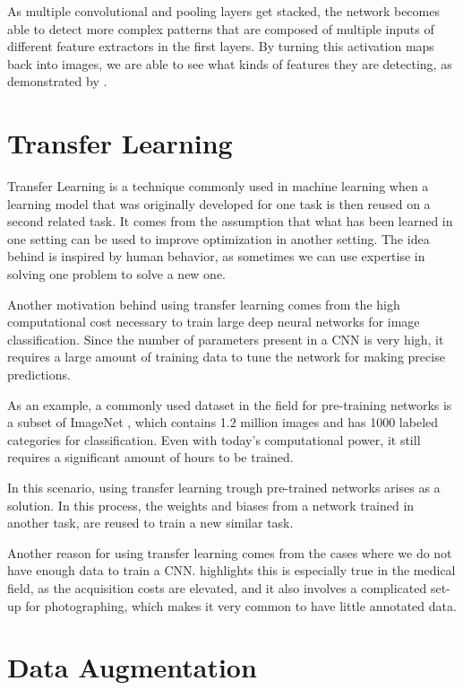 
As multiple convolutional and pooling layers get stacked, the network becomes able to detect more complex patterns that are composed of multiple inputs of different feature extractors in the first layers. By turning this activation maps back into images, we are able to see what kinds of features they are detecting, as demonstrated by \citep{ZeilerF14}.

\section{Transfer Learning}

Transfer Learning is a technique commonly used in machine learning when a learning model that was originally developed for one task is then reused on a second related task. It comes from the assumption that what has been learned in one setting can be used to improve optimization in another setting. The idea behind is inspired by human behavior, as sometimes we can use expertise in solving one problem to solve a new one.

Another motivation behind using transfer learning comes from the high computational cost necessary to train large deep neural networks for image classification. Since the number of parameters present in a CNN is very high, it requires a large amount of training data to tune the network for making precise predictions.

As an example, a commonly used dataset in the field for pre-training networks is a subset of ImageNet \citep{DengDSLL009}, which contains 1.2 million images and has 1000 labeled categories for classification. Even with today's computational power, it still requires a significant amount of hours to be trained.

In this scenario, using transfer learning trough pre-trained networks arises as a solution. In this process, the weights and biases from a network trained in another task, are reused to train a new similar task.

Another reason for using transfer learning comes from the cases where we do not have enough data to train a CNN. \cite{CelonaBB19} highlights this is especially true in the medical field, as the acquisition costs are elevated, and it also involves a complicated set-up for photographing, which makes it very common to have little annotated data.

\section{Data Augmentation}

